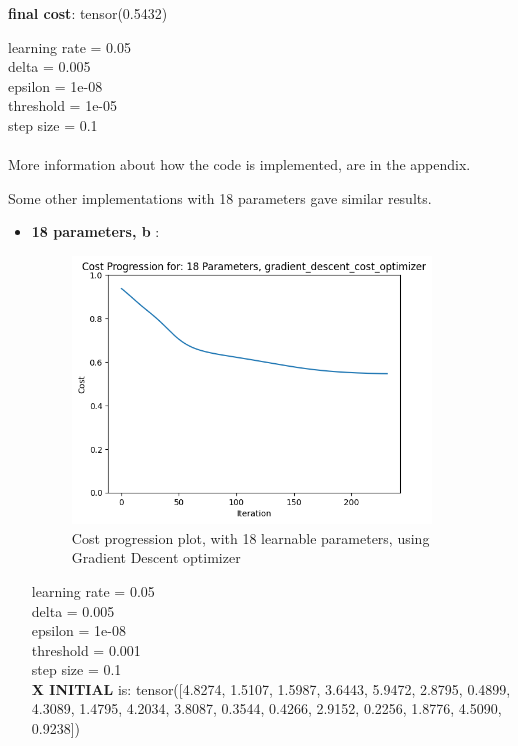 \documentclass[inscr,ack,preface]{diphdthesis}
\begin{document}
\textbf{final cost}: tensor(0.5432)

learning rate =  0.05\\ 
delta =  0.005 \\
epsilon =  1e-08 \\
threshold =  1e-05 \\
step size =  0.1 \\
\\More information about how the code is implemented, are in the appendix.

Some other implementations with 18 parameters gave similar results.

\begin{itemize}
    \item \textbf{18 parameters, b } :

\begin{figure}[ht]
\begin{center}
    \includegraphics[width=0.9\textwidth]{18.png}
    \caption{Cost progression plot, with 18 learnable parameters, using Gradient Descent optimizer} 
    \label{fig:enter-label}
    \end{center}
\end{figure}

learning rate =  0.05 \\
delta =  0.005 \\
epsilon =  1e-08 \\
threshold =  0.001 \\
step size =  0.1 \\

\textbf{X INITIAL} is: tensor([4.8274, 1.5107, 1.5987, 3.6443, 5.9472, 2.8795, 0.4899, 4.3089, 1.4795,
        4.2034, 3.8087, 0.3544, 0.4266, 2.9152, 0.2256, 1.8776, 4.5090, 0.9238])
        

\end{itemize}
\end{document}
